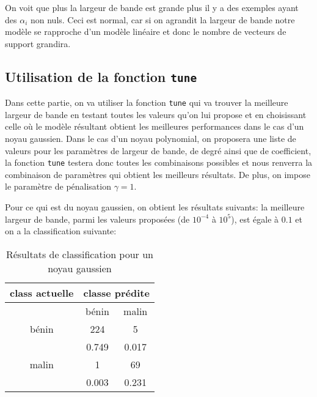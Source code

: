 \documentclass{article}
\begin{document}
\begin{multicols}{2}
On voit que plus la largeur de bande est grande plus il y a des exemples ayant
des $\alpha_i$ non nuls. Ceci est normal, car si on agrandit la largeur de bande
notre modèle se rapproche d'un modèle linéaire et donc le nombre de vecteurs
de support grandira.

\subsection{Utilisation de la fonction \texttt{tune}}\label{subsec:ex44}

Dans cette partie, on va utiliser la fonction \texttt{tune} qui va trouver la
meilleure largeur de bande en testant toutes les valeurs qu'on lui propose et
en choisissant celle où le modèle résultant obtient les meilleures performances
dans le cas d'un noyau gaussien. Dans le cas d'un noyau polynomial, on proposera
une liste de valeurs pour les paramètres de largeur de bande, de degré ainsi que
de coefficient, la fonction \texttt{tune} testera donc toutes les combinaisons
possibles et nous renverra la combinaison de paramètres qui obtient les
meilleurs résultats. De plus, on impose le paramètre de pénalisation
$\gamma = 1$.

Pour ce qui est du noyau gaussien, on obtient les résultats suivants: la
meilleure largeur de bande, parmi les valeurs proposées (de $10^{-4}$ à $10^5$),
est égale à $0.1$ et on a la classification suivante:

\begin{table}[H]
    \begin{center}
        \centering
        \captionsetup{justification=centering}
        \caption{\label{tab:gaussEx4}Résultats de classification pour un noyau
        gaussien}
        \begin{tabular}{|c|c|c|}
            \hline
            class actuelle & \multicolumn{2}{|c|}{classe prédite} \\
            \hline
                           & bénin & malin \\
            \hline
            bénin & 224 & 5 \\
                   & 0.749 & 0.017 \\
            \hline
            malin & 1 & 69 \\
                  & 0.003 & 0.231 \\
            \hline
        \end{tabular}
    \end{center}
\end{table}


\end{multicols}
\end{document}
